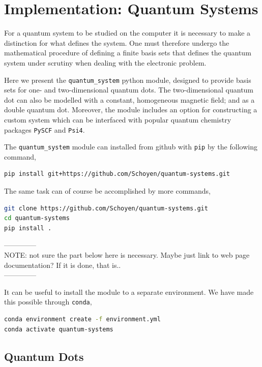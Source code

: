 \chapter{Implementation: Quantum Systems}

For a quantum system to be studied on the computer it is necessary to 
make a distinction for what defines the system. One must therefore undergo the
mathematical procedure of defining a finite basis sets that defines the 
quantum system under scrutiny when dealing with the electronic problem. 

Here we present the \lstinline{quantum_system} python module, designed to 
provide basis sets for one- and two-dimensional quantum dots. The two-dimensional 
quantum dot can also be modelled with a constant, homogeneous magnetic field; and 
as a double quantum dot. 
Moreover, the module includes an option for constructing a custom system which can 
be interfaced with popular quantum chemistry packages \lstinline{PySCF}\cite{PYSCF} 
and \lstinline{Psi4}\cite{parrish2017psi4}.

The \lstinline{quantum_system} module can installed from github with \lstinline{pip}
by the following command,
\begin{lstlisting}[language=bash]
pip install git+https://github.com/Schoyen/quantum-systems.git
\end{lstlisting}
The same task can of course be accomplished by more commands,
\begin{lstlisting}[language=bash]
git clone https://github.com/Schoyen/quantum-systems.git
cd quantum-systems
pip install .
\end{lstlisting}

\noindent
--------------\\
NOTE: not sure the part below here is necessary. Maybe just link to web page 
documentation? If it is done, that is.. \\
--------------

It can be useful to install the module to a separate environment. We have made this 
possible through \lstinline{conda},
\begin{lstlisting}[language=bash]
conda environment create -f environment.yml
conda activate quantum-systems    
\end{lstlisting}

\section{Quantum Dots}

